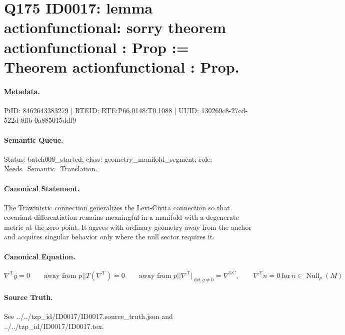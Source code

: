 \section*{Q175 ID0017: lemma actionfunctional: sorry theorem actionfunctional : Prop := Theorem actionfunctional : Prop.}
\paragraph{Metadata.}
PiID: 8462643383279 | RTEID: RTE:P66.0148:T0.1088 | UUID: 130269c8-27cd-522d-8ffb-0a885015ddf9

\paragraph{Semantic Queue.}
Status: batch008\_started; class: geometry\_manifold\_segment; role: Needs\_Semantic\_Translation.

\paragraph{Canonical Statement.}
The Trawinistic connection generalizes the Levi-Civita connection so that covariant differentiation remains meaningful in a manifold with a degenerate metric at the zero point. It agrees with ordinary geometry away from the anchor and acquires singular behavior only where the null sector requires it.

\paragraph{Canonical Equation.}
\[
\nabla^{\mathrm{T}} g = 0 \qquad \text{away from } p || T(\nabla^{\mathrm{T}})=0 \qquad \text{away from } p || \nabla^{\mathrm{T}}\big\vert_{\det g \neq 0} = \nabla^{\mathrm{LC}}, \qquad \nabla^{\mathrm{T}} n = 0 \ \text{for}\ n \in \operatorname{Null}_{p}(M)
\]

\paragraph{Source Truth.}
See ../../tzp\_id/ID0017/ID0017.source\_truth.json and ../../tzp\_id/ID0017/ID0017.tex.
